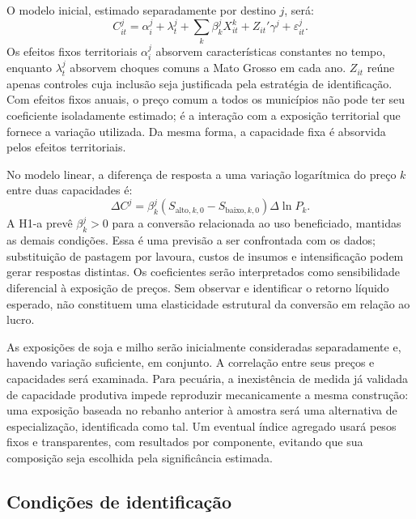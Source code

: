 O modelo inicial, estimado separadamente por destino $j$, será:
\begin{equation}
 C_{it}^{j}
 =\alpha_i^{j}+\lambda_t^{j}
 +\sum_k\beta_k^{j}X_{it}^{k}
 +Z_{it}'\gamma^{j}+\varepsilon_{it}^{j}.
 \label{eq:h1a}
\end{equation}
Os efeitos fixos territoriais $\alpha_i^{j}$ absorvem características constantes no tempo, enquanto $\lambda_t^{j}$ absorvem choques comuns a Mato Grosso em cada ano. $Z_{it}$ reúne apenas controles cuja inclusão seja justificada pela estratégia de identificação. Com efeitos fixos anuais, o preço comum a todos os municípios não pode ter seu coeficiente isoladamente estimado; é a interação com a exposição territorial que fornece a variação utilizada. Da mesma forma, a capacidade fixa é absorvida pelos efeitos territoriais.

No modelo linear, a diferença de resposta a uma variação logarítmica do preço $k$ entre duas capacidades é:
\begin{equation}
 \Delta C^{j}
 =\beta_k^{j}(S_{\mathrm{alto},k,0}-S_{\mathrm{baixo},k,0})
   \Delta\ln P_k.
 \label{eq:efeito}
\end{equation}
A H1-a prevê $\beta_k^{j}>0$ para a conversão relacionada ao uso beneficiado, mantidas as demais condições. Essa é uma previsão a ser confrontada com os dados; substituição de pastagem por lavoura, custos de insumos e intensificação podem gerar respostas distintas. Os coeficientes serão interpretados como sensibilidade diferencial à exposição de preços. Sem observar e identificar o retorno líquido esperado, não constituem uma elasticidade estrutural da conversão em relação ao lucro.

As exposições de soja e milho serão inicialmente consideradas separadamente e, havendo variação suficiente, em conjunto. A correlação entre seus preços e capacidades será examinada. Para pecuária, a inexistência de medida já validada de capacidade produtiva impede reproduzir mecanicamente a mesma construção: uma exposição baseada no rebanho anterior à amostra será uma alternativa de especialização, identificada como tal. Um eventual índice agregado usará pesos fixos e transparentes, com resultados por componente, evitando que sua composição seja escolhida pela significância estimada.

\subsection{Condições de identificação}

